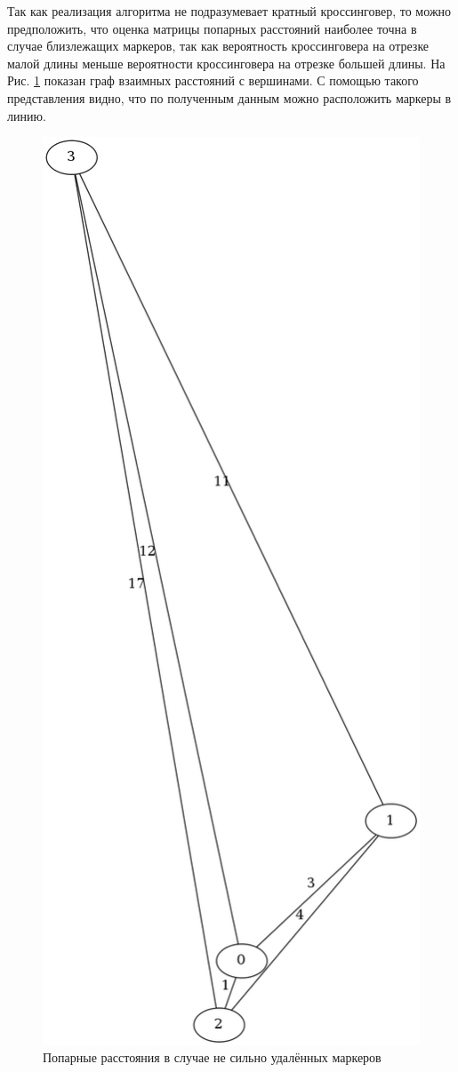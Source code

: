 \documentclass{matmex-diploma-custom}
\begin{document}
Так как реализация алгоритма не подразумевает кратный кроссинговер, то
можно предположить, что оценка матрицы попарных расстояний наиболее
точна в случае близлежащих маркеров, так как вероятность кроссинговера
на отрезке малой длины меньше вероятности кроссинговера на отрезке
большей длины. На Рис. \ref{fig:fig1} показан граф взаимных расстояний
с вершинами. С помощью такого представления видно, что по полученным
данным можно расположить маркеры в линию.
\begin{figure}[h]
 \centering
  \includegraphics[width=1.0\textwidth]{good.png}
  \caption[width=0.4\textwidth]{Попарные расстояния в случае не сильно
    удалённых маркеров}
  \label{fig:fig1}
\end{figure}
\end{document}
